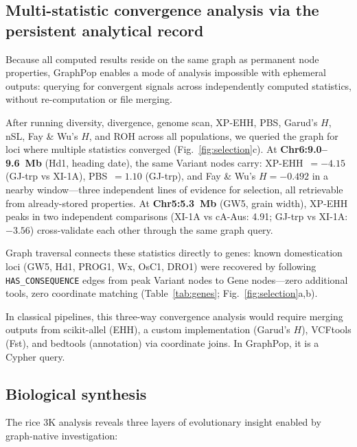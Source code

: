 \subsection*{Multi-statistic convergence analysis via the persistent analytical record}

Because all computed results reside on the same graph as permanent node properties, GraphPop enables a mode of analysis impossible with ephemeral outputs: querying for convergent signals across independently computed statistics, without re-computation or file merging.

After running diversity, divergence, genome scan, XP-EHH, PBS, Garud's $H$, nSL, Fay \& Wu's $H$, and ROH across all populations, we queried the graph for loci where multiple statistics converged (Fig.~\ref{fig:selection}c). At \textbf{Chr6:9.0--9.6~Mb} (Hd1, heading date\cite{huang2012map}), the same Variant nodes carry: XP-EHH~$= -4.15$ (GJ-trp vs XI-1A), PBS~$= 1.10$ (GJ-trp), and Fay \& Wu's $H = -0.492$ in a nearby window---three independent lines of evidence for selection, all retrievable from already-stored properties. At \textbf{Chr5:5.3~Mb} (GW5, grain width), XP-EHH peaks in two independent comparisons (XI-1A vs cA-Aus: 4.91; GJ-trp vs XI-1A: $-3.56$) cross-validate each other through the same graph query.

Graph traversal connects these statistics directly to genes: known domestication loci (GW5, Hd1, PROG1, Wx, OsC1, DRO1\cite{huang2012map,alam2025genomics}) were recovered by following \texttt{HAS\_CONSEQUENCE} edges from peak Variant nodes to Gene nodes---zero additional tools, zero coordinate matching (Table~\ref{tab:genes}; Fig.~\ref{fig:selection}a,b).

In classical pipelines, this three-way convergence analysis would require merging outputs from scikit-allel (EHH), a custom implementation (Garud's $H$), VCFtools (Fst), and bedtools (annotation) via coordinate joins. In GraphPop, it is a Cypher query.

\subsection*{Biological synthesis}

The rice 3K analysis reveals three layers of evolutionary insight enabled by graph-native investigation:

